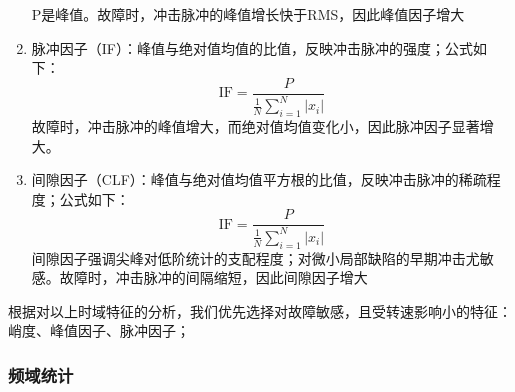 \documentclass[a4paper]{CPIPC}
\numberwithin{equation}{section}
\begin{document}
\begin{enumerate}
\begin{equation}
    \end{equation}
    P是峰值。故障时，冲击脉冲的峰值增长快于RMS，因此峰值因子增大
    \item 脉冲因子（IF）：峰值与绝对值均值的比值，反映冲击脉冲的强度；公式如下：
     \begin{equation}
       \text{IF} = \frac{P}{\frac{1}{N} \sum_{i=1}^{N} |x_i|}
    \end{equation}
    故障时，冲击脉冲的峰值增大，而绝对值均值变化小，因此脉冲因子显著增大。
    \item 间隙因子（CLF）：峰值与绝对值均值平方根的比值，反映冲击脉冲的稀疏程度；公式如下：
     \begin{equation}
       \text{IF} = \frac{P}{\frac{1}{N} \sum_{i=1}^{N} |x_i|}
    \end{equation}
    间隙因子强调尖峰对低阶统计的支配程度；对微小局部缺陷的早期冲击尤敏感。故障时，冲击脉冲的间隔缩短，因此间隙因子增大
\end{enumerate}

根据对以上时域特征的分析，我们优先选择对故障敏感，且受转速影响小的特征：峭度、峰值因子、脉冲因子；

\subsubsection{频域统计}
\end{document}
